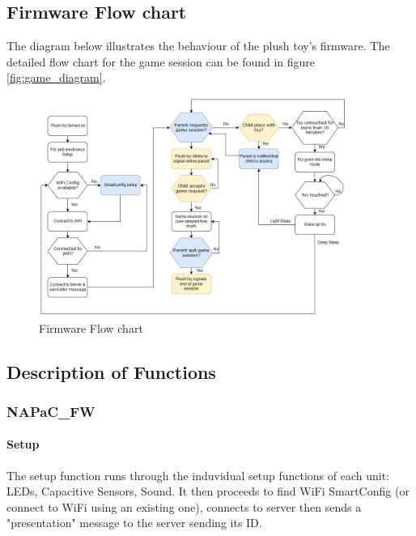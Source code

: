 \subsection{Firmware Flow chart}

The diagram below illustrates the behaviour of the plush toy's firmware. The detailed flow chart for the game session can be found in figure \ref{fig:game_diagram}.

\begin{figure}[ht]
    \centering
    \includegraphics[width=0.9\textwidth]{images/FW/FW_diagram.jpg}
    \caption{Firmware Flow chart}
    \label{fig:FW_flowchart}
\end{figure}
    
\newpage    
\subsection{Description of Functions}

\subsubsection{NAPaC\_FW}

\paragraph{Setup}
The setup function runs through the induvidual setup functions of each unit: LEDs, Capacitive Sensors, Sound. It then proceeds to find WiFi SmartConfig (or connect to WiFi using an existing one), connects to server then sends a "presentation" message to the server sending its ID.



